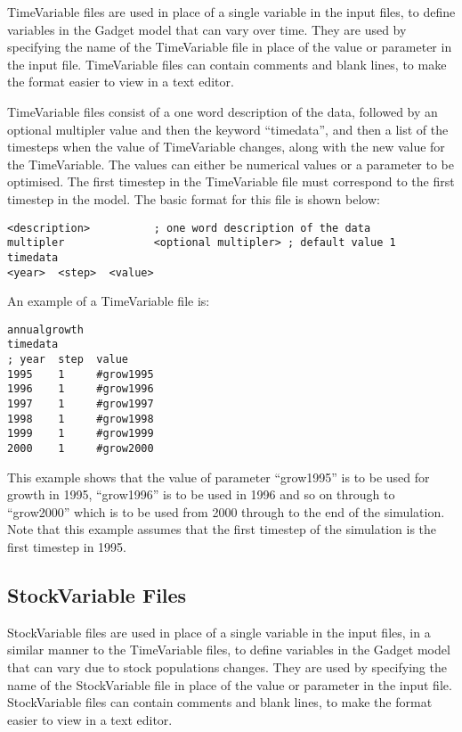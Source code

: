 \documentclass[]{book}
\begin{document}
TimeVariable files are used in place of a single variable in the input
files, to define variables in the Gadget model that can vary over time.
They are used by specifying the name of the TimeVariable file in place
of the value or parameter in the input file. TimeVariable files can
contain comments and blank lines, to make the format easier to view in a
text editor.

TimeVariable files consist of a one word description of the data,
followed by an optional multipler value and then the keyword ``timedata'',
and then a list of the timesteps when the value of TimeVariable changes,
along with the new value for the TimeVariable. The values can either be
numerical values or a parameter to be optimised. The first timestep in
the TimeVariable file must correspond to the first timestep in the
model. The basic format for this file is shown below:

\begin{verbatim}
<description>          ; one word description of the data
multipler              <optional multipler> ; default value 1
timedata
<year>  <step>  <value>
\end{verbatim}

An example of a TimeVariable file is:

\begin{verbatim}
annualgrowth
timedata
; year  step  value
1995    1     #grow1995
1996    1     #grow1996
1997    1     #grow1997
1998    1     #grow1998
1999    1     #grow1999
2000    1     #grow2000
\end{verbatim}

This example shows that the value of parameter ``grow1995'' is to be used
for growth in 1995, ``grow1996'' is to be used in 1996 and so on through
to ``grow2000'' which is to be used from 2000 through to the end of the
simulation. Note that this example assumes that the first timestep of
the simulation is the first timestep in 1995.

\hypertarget{subsec:stockvar}{%
\subsection{StockVariable Files}\label{subsec:stockvar}}

StockVariable files are used in place of a single variable in the input
files, in a similar manner to the TimeVariable files, to define
variables in the Gadget model that can vary due to stock populations
changes. They are used by specifying the name of the StockVariable file
in place of the value or parameter in the input file. StockVariable
files can contain comments and blank lines, to make the format easier to
view in a text editor.
\end{document}
